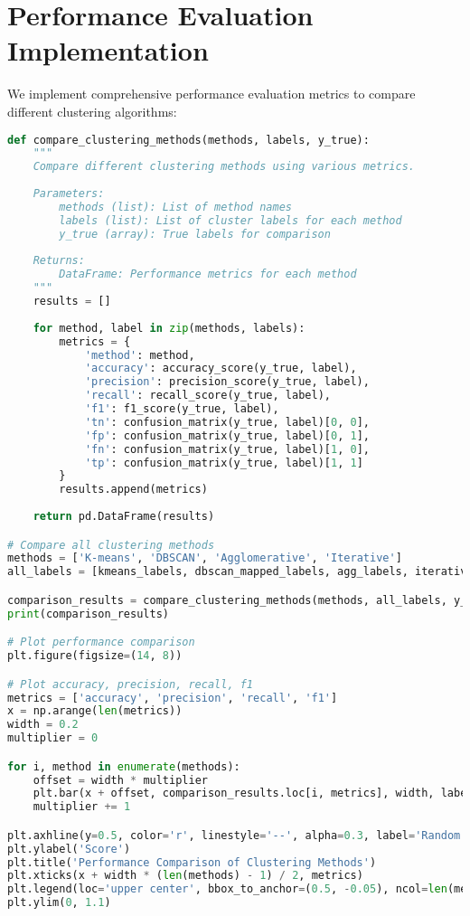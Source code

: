 \section{Performance Evaluation Implementation}
We implement comprehensive performance evaluation metrics to compare different clustering algorithms:

\begin{lstlisting}[language=Python, caption=Performance Evaluation Implementation]
def compare_clustering_methods(methods, labels, y_true):
    """
    Compare different clustering methods using various metrics.
    
    Parameters:
        methods (list): List of method names
        labels (list): List of cluster labels for each method
        y_true (array): True labels for comparison
    
    Returns:
        DataFrame: Performance metrics for each method
    """
    results = []
    
    for method, label in zip(methods, labels):
        metrics = {
            'method': method,
            'accuracy': accuracy_score(y_true, label),
            'precision': precision_score(y_true, label),
            'recall': recall_score(y_true, label),
            'f1': f1_score(y_true, label),
            'tn': confusion_matrix(y_true, label)[0, 0],
            'fp': confusion_matrix(y_true, label)[0, 1],
            'fn': confusion_matrix(y_true, label)[1, 0],
            'tp': confusion_matrix(y_true, label)[1, 1]
        }
        results.append(metrics)
    
    return pd.DataFrame(results)

# Compare all clustering methods
methods = ['K-means', 'DBSCAN', 'Agglomerative', 'Iterative']
all_labels = [kmeans_labels, dbscan_mapped_labels, agg_labels, iterative_labels]

comparison_results = compare_clustering_methods(methods, all_labels, y_true)
print(comparison_results)

# Plot performance comparison
plt.figure(figsize=(14, 8))

# Plot accuracy, precision, recall, f1
metrics = ['accuracy', 'precision', 'recall', 'f1']
x = np.arange(len(metrics))
width = 0.2
multiplier = 0

for i, method in enumerate(methods):
    offset = width * multiplier
    plt.bar(x + offset, comparison_results.loc[i, metrics], width, label=method)
    multiplier += 1

plt.axhline(y=0.5, color='r', linestyle='--', alpha=0.3, label='Random Classifier')
plt.ylabel('Score')
plt.title('Performance Comparison of Clustering Methods')
plt.xticks(x + width * (len(methods) - 1) / 2, metrics)
plt.legend(loc='upper center', bbox_to_anchor=(0.5, -0.05), ncol=len(methods))
plt.ylim(0, 1.1)


\end{lstlisting}
